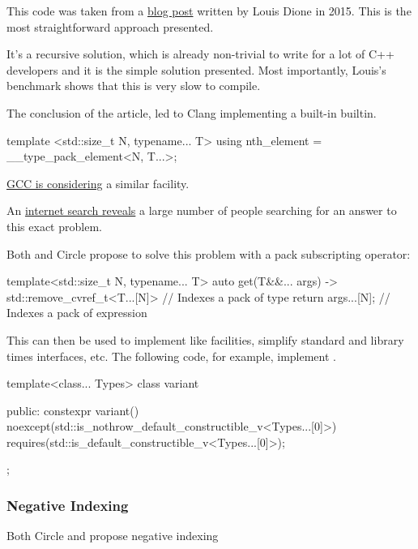 \documentclass{wg21}
\begin{document}
This code was taken from a \href{https://ldionne.com/2015/11/29/efficient-parameter-pack-indexing/}{blog post} written by Louis Dione in 2015.
This is the most straightforward approach presented.

It's a recursive solution, which is already non-trivial to write for a lot of C++ developers and it is the simple solution presented.
Most importantly, Louis's benchmark shows that this is very slow to compile.

The conclusion of the article, led to Clang implementing a built-in  builtin.

\begin{colorblock}
template <std::size_t N, typename... T>
using nth_element = __type_pack_element<N, T...>;
\end{colorblock}

\href{https://gcc.gnu.org/bugzilla/show_bug.cgi?id=100157}{GCC is considering} a similar facility.

An \href{https://gcc.gnu.org/bugzilla/show_bug.cgi?id=100157}{internet search reveals} a large number of people searching for an answer to this exact problem.

Both  and Circle propose to solve this problem with a pack subscripting operator:

\begin{colorblock}
template<std::size_t N, typename... T>
auto get(T&&... args) -> std::remove_cvref_t<T...[N]> // Indexes a pack of type {
    return args...[N]; // Indexes a pack of expression
}
\end{colorblock}

This can then be used to implement  like facilities, simplify standard and library times interfaces, etc.
The following code, for example, implement .

\begin{colorblock}
template<class... Types>
class variant {
public:
    constexpr variant()
    noexcept(std::is_nothrow_default_constructible_v<Types...[0]>)
    requires(std::is_default_constructible_v<Types...[0]>);

};
\end{colorblock}

\subsubsection{Negative Indexing}

Both Circle and  propose negative indexing
\end{document}
